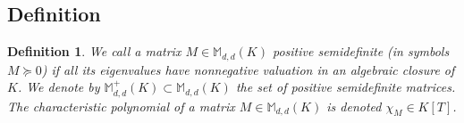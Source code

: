 \documentclass[a4paper,12pt]{article}
\newtheorem{definition}{Definition}
\newcommand{\allmat}{\mathbb{M}} %
\begin{document}
\subsection{Definition}
\newcommand\Mat{Positive semidefinite matrix }
\newcommand\mats{positive semidefinite matrices }
\newcommand\Mats{positive semidefinite matrices }

\begin{definition}
  We call a matrix $M \in \allmat_{d,d}(K)$ \emph{positive semidefinite} (in symbols $M \succeq 0$)
  if all its eigenvalues have nonnegative valuation in an algebraic closure of $K$.
  We denote by $\allmat_{d,d}^+(K) \subset \allmat_{d,d}(K)$ the set of positive semidefinite matrices.
  The characteristic polynomial of a matrix $M \in \allmat_{d,d}(K)$ is denoted $\chi_M \in K[T]$.
\end{definition}
\end{document}
